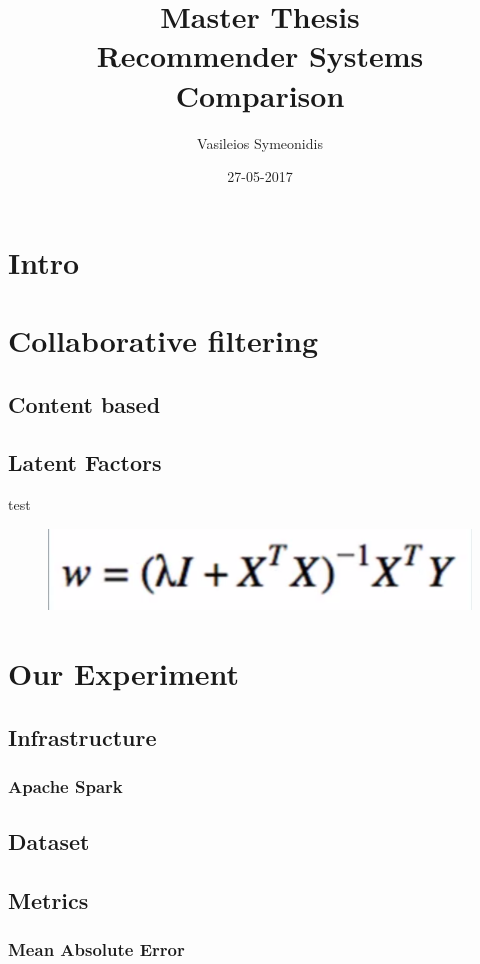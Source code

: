 \documentclass{article}
\title{Master Thesis \\ Recommender Systems Comparison}
\date{27-05-2017}
\author{Vasileios Symeonidis}
\begin{document}
\maketitle
\newpage
\tableofcontents
{}
\newpage
{}

\section{Intro}

\section{Collaborative filtering}
\subsection{Content based}
\subsection{Latent Factors}
test
\\
\begin{figure}
\centering
\includegraphics[width=0.7\linewidth]{equation01}
\caption{}
\label{fig:equation01}
\end{figure}

\section{Our Experiment}
\subsection{Infrastructure}
\subsubsection{Apache Spark}
\subsection{Dataset}
\subsection{Metrics}
\subsubsection{Mean Absolute Error}
\end{document}
